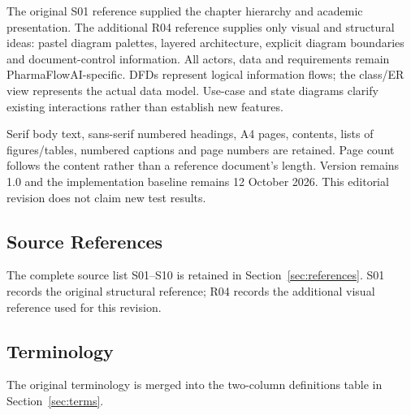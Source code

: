 \documentclass[11pt,a4paper]{article}
\begin{document}
The original S01 reference supplied the chapter hierarchy and academic presentation. The additional R04 reference supplies only visual and structural ideas: pastel diagram palettes, layered architecture, explicit diagram boundaries and document-control information. All actors, data and requirements remain PharmaFlowAI-specific. DFDs represent logical information flows; the class/ER view represents the actual data model. Use-case and state diagrams clarify existing interactions rather than establish new features.

Serif body text, sans-serif numbered headings, A4 pages, contents, lists of figures/tables, numbered captions and page numbers are retained. Page count follows the content rather than a reference document's length. Version remains 1.0 and the implementation baseline remains 12 October 2026. This editorial revision does not claim new test results.

\subsection{Source References}
The complete source list S01--S10 is retained in Section~\ref{sec:references}. S01 records the original structural reference; R04 records the additional visual reference used for this revision.

\subsection{Terminology}
The original terminology is merged into the two-column definitions table in Section~\ref{sec:terms}.
\end{document}
